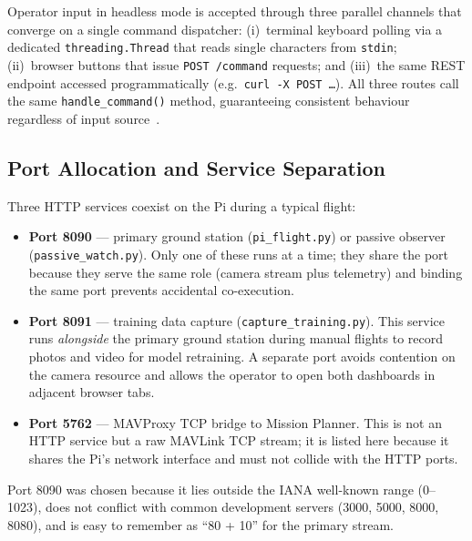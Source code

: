 Operator input in headless mode is accepted through three parallel channels that converge
on a single command dispatcher: (i)~terminal keyboard polling via a dedicated
\texttt{threading.Thread} that reads single characters from \texttt{stdin}; (ii)~browser
buttons that issue \texttt{POST /command} requests; and (iii)~the same REST endpoint
accessed programmatically (e.g.\ \texttt{curl -X POST \ldots}). All three routes call the
same \texttt{handle\_command()} method, guaranteeing consistent behaviour regardless of
input source~\cite{goodrich2007human}.

\subsection{Port Allocation and Service Separation}\label{sec:port-alloc}

Three HTTP services coexist on the Pi during a typical flight:

\begin{itemize}
  \item \textbf{Port 8090} --- primary ground station (\texttt{pi\_flight.py}) or passive
        observer (\texttt{passive\_watch.py}). Only one of these runs at a time; they
        share the port because they serve the same role (camera stream plus telemetry) and
        binding the same port prevents accidental co-execution.
  \item \textbf{Port 8091} --- training data capture (\texttt{capture\_training.py}). This
        service runs \emph{alongside} the primary ground station during manual flights to
        record photos and video for model retraining. A separate port avoids contention on
        the camera resource and allows the operator to open both dashboards in adjacent
        browser tabs.
  \item \textbf{Port 5762} --- MAVProxy TCP bridge to Mission Planner. This is not an HTTP
        service but a raw MAVLink TCP stream; it is listed here because it shares the Pi's
        network interface and must not collide with the HTTP ports.
\end{itemize}

Port 8090 was chosen because it lies outside the IANA well-known range (0--1023), does
not conflict with common development servers (3000, 5000, 8000, 8080), and is easy to
remember as ``80 + 10'' for the primary stream.


